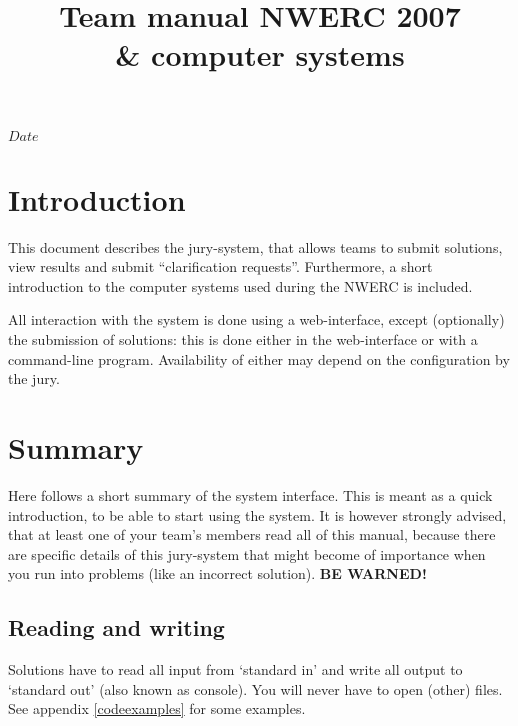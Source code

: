 

\usepackage[english]{babel}

\SVNdate $Date$

\title{Team manual NWERC 2007\\ \DOMjudge \& computer systems}



\begin{titlepage}
\maketitle
\end{titlepage}

\newpage
\tableofcontents

\newpage
\section{Introduction}

This document describes the \DOMjudge jury-system, that allows
teams to submit solutions, view results and submit
``clarification requests''. Furthermore, a short introduction to the
computer systems used during the NWERC is included.

All interaction with the system is done using a web-interface, except
(optionally) the submission of solutions: this is done either in the
web-interface or with a command-line program. Availability of either
may depend on the configuration by the jury.

\section{Summary}

Here follows a short summary of the system interface. This is meant as
a quick introduction, to be able to start using the system. It is
however strongly advised, that at least one of your team's members
read all of this manual, because there are specific details of this
jury-system that might become of importance when you run into
problems (like an incorrect solution). \textbf{BE WARNED!}

\subsection{Reading and writing}

Solutions have to read all input from `standard in' and write all
output to `standard out' (also known as console). You will never have
to open (other) files. See appendix \ref{codeexamples} for some
examples.


